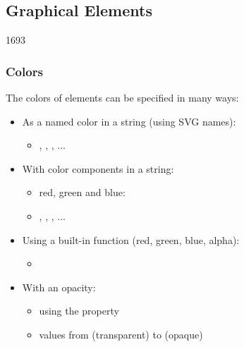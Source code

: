 %
%
%
%


\subsection{Graphical Elements}

\begin{slide}{1693}\frametitle{Colors}

The colors of elements can be specified in many ways:

\begin{itemize}
\item As a named color in a string (using SVG names):
  \begin{itemize}
  \item {}, , , ...
  \end{itemize}
  \vspace*{0.5em}
\item With color components in a string:
  \begin{itemize}
  \item red, green and blue: 
  \item {}, , , ...
  \end{itemize}
  \vspace*{0.5em}
\item Using a built-in function (red, green, blue, alpha):
  \begin{itemize}
  \item {}
  \end{itemize}
  \vspace*{0.5em}
\item With an opacity:
  \begin{itemize}
  \item using the  property
  \item values from  (transparent) to  (opaque)
  \end{itemize}
\end{itemize}

\end{slide}

